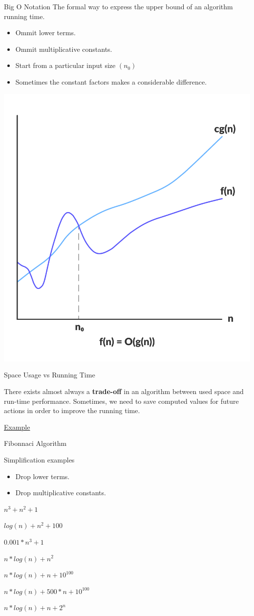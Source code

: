 \documentclass{beamer}
\begin{document}
\begin{frame}{Big O Notation}
  The formal way to express the upper bound of an algorithm running time.
  
  \begin{itemize}
    \item Ommit lower terms.
    \item Ommit multiplicative constants.
    \item Start from a particular input size $(n_0)$
    \item Sometimes the constant factors makes a considerable difference.
  \end{itemize}

  \begin{center}
    \includegraphics[width=.35\linewidth]{../img/bigO}
  \end{center}
\end{frame}


\begin{frame}{Space Usage vs Running Time}

  There exists almost always a \textbf{trade-off} in an algorithm between used space and run-time performance. Sometimes, we need to save computed values for future actions in order to improve the running time.

  \underline{Example}

  Fibonnaci Algorithm

\end{frame}

\begin{frame}{Simplification examples}

  \begin{itemize}
    \item Drop lower terms.
    \item Drop multiplicative constants.
  \end{itemize}

  \begin{center}

  $n^3 + n^2 + 1$

  $log(n) + n^2 + 100$

  $0.001*n^3 + 1$

  $ n*log(n) + n^2$

  $ n*log(n) + n + 10^{100}$

  $ n*log(n) + 500*n + 10^{100}$

  $ n*log(n) + n + 2^n$

  \end{center}

\end{frame}
\end{document}
